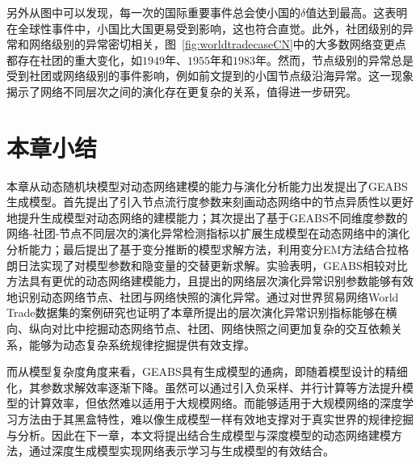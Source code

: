 另外从图中可以发现，每一次的国际重要事件总会使小国的$\delta$值达到最高。这表明在全球性事件中，小国比大国更易受到影响，这也符合直觉。此外，社团级别的异常和网络级别的异常密切相关，图~\ref{fig:worldtradecaseCN}中的大多数网络变更点都存在社团的重大变化，如$1949$年、$1955$年和$1983$年。然而，节点级别的异常总是受到社团或网络级别的事件影响，例如前文提到的小国节点级沿海异常。这一现象揭示了网络不同层次之间的演化存在更复杂的关系，值得进一步研究。



\section{本章小结\label{chap4:summary}}

本章从动态随机块模型对动态网络建模的能力与演化分析能力出发提出了GEABS生成模型。首先提出了引入节点流行度参数来刻画动态网络中的节点异质性以更好地提升生成模型对动态网络的建模能力；其次提出了基于GEABS不同维度参数的网络-社团-节点不同层次的演化异常检测指标以扩展生成模型在动态网络中的演化分析能力；最后提出了基于变分推断的模型求解方法，利用变分EM方法结合拉格朗日法实现了对模型参数和隐变量的交替更新求解。实验表明，GEABS相较对比方法具有更优的动态网络建模能力，且提出的网络层次演化异常识别参数能够有效地识别动态网络节点、社团与网络快照的演化异常。通过对世界贸易网络World Trade数据集的案例研究也证明了本章所提出的层次演化异常识别指标能够在横向、纵向对比中挖掘动态网络节点、社团、网络快照之间更加复杂的交互依赖关系，能够为动态复杂系统规律挖掘提供有效支撑。

而从模型复杂度角度来看，GEABS具有生成模型的通病，即随着模型设计的精细化，其参数求解效率逐渐下降。虽然可以通过引入负采样、并行计算等方法提升模型的计算效率，但依然难以适用于大规模网络。而能够适用于大规模网络的深度学习方法由于其黑盒特性，难以像生成模型一样有效地支撑对于真实世界的规律挖掘与分析。因此在下一章，本文将提出结合生成模型与深度模型的动态网络建模方法，通过深度生成模型实现网络表示学习与生成模型的有效结合。